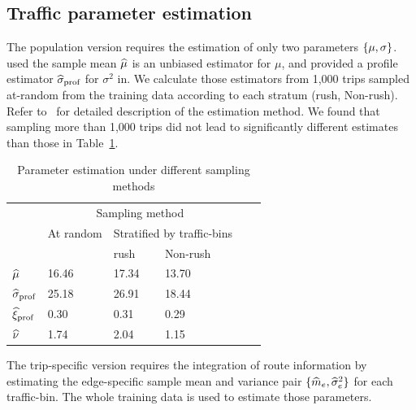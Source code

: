 \documentclass[12pt]{article}
\begin{document}
{{{{{{\subsection{Traffic parameter estimation}
The population version requires the estimation of only two parameters $\left\{\mu, \sigma\right\}$.~\cite{elmasri2020predictive} used the sample mean ${\widehat \mu}$ is an unbiased estimator for $\mu$, and provided a profile estimator $\widehat \sigma_\text{prof}$ for $\sigma^2$ in. We calculate those estimators from 1,000 trips sampled at-random from the training data according to each stratum (rush, Non-rush). Refer to~\citet[Sec.~3.3.2]{elmasri2020predictive} for detailed description of the estimation method. We found that sampling more than 1,000 trips did not lead to significantly different estimates than those in Table~\ref{tb:parameter-estimates}.
\begin{table}[!htp]
  \centering
    \caption{Parameter estimation under different sampling methods}
    \label{tb:parameter-estimates}
    {\footnotesize 
  \begin{tabular}{l lllll}
                      & \multicolumn{3}{c}{Sampling method}                                \\
                      & At random         & \multicolumn{2}{c}{Stratified by traffic-bins} \\[5pt]
                     
                      &                   & {rush} & {Non-rush}                         \\
    \({\widehat \mu}\)        & 16.46             & 17.34     & 13.70                              \\   
    \(\widehat \sigma_\text{prof}\) & 25.18             & 26.91     & 18.44                              \\
    \midrule
    \({\widehat{\xi}_\text{prof}}\)        & 0.30              & 0.31     & 0.29                               \\
    \({\widehat \nu}\)        & 1.74              & 2.04      & 1.15
  \end{tabular}
  }
\end{table}

The trip-specific version requires the integration of route information by estimating the edge-specific sample mean and variance pair \(\{{\widehat m}_{e}, {\widehat \sigma^2}_{e}\}\) for each traffic-bin. The whole training data is used to estimate those parameters. 

}}}}}}
\end{document}

